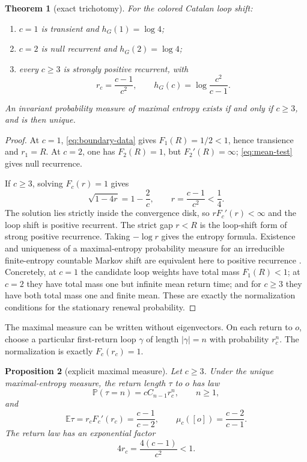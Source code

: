 \documentclass[11pt,a4paper]{amsart}
\newtheorem{theorem}{Theorem}[section]
\newtheorem{proposition}[theorem]{Proposition}
\theoremstyle{definition}
\theoremstyle{remark}
\begin{document}
\begin{theorem}[exact trichotomy]\label{thm:trichotomy}
For the colored Catalan loop shift:
\begin{enumerate}
\item $c=1$ is transient and $h_G(1)=\log4$;
\item $c=2$ is null recurrent and $h_G(2)=\log4$;
\item every $c\geq3$ is strongly positive recurrent, with
\[
 r_c=\frac{c-1}{c^2},\qquad
 h_G(c)=\log\frac{c^2}{c-1}.
\]
\end{enumerate}
An invariant probability measure of maximal entropy exists if and only if
$c\geq3$, and is then unique.
\end{theorem}

\begin{proof}
At $c=1$, \eqref{eq:boundary-data} gives $F_1(R)=1/2<1$, hence transience
and $r_1=R$.  At $c=2$, one has $F_2(R)=1$, but
$F_2'(R)=\infty$; \eqref{eq:mean-test} gives null recurrence.

If $c\geq3$, solving $F_c(r)=1$ gives
\[
 \sqrt{1-4r}=1-\frac2c,\qquad
 r=\frac{c-1}{c^2}<\frac14.
\]
The solution lies strictly inside the convergence disk, so
$rF_c'(r)<\infty$ and the loop shift is positive recurrent.  The strict
gap $r<R$ is the loop-shift form of strong positive recurrence.  Taking
$-\log r$ gives the entropy formula.  Existence and uniqueness of a
maximal-entropy probability measure for an irreducible finite-entropy
countable Markov shift are equivalent here to positive recurrence
\cite{GurevichSavchenko1998,Sarig1999}.  Concretely, at $c=1$ the candidate
loop weights have total mass $F_1(R)<1$; at $c=2$ they have total mass one
but infinite mean return time; and for $c\geq3$ they have both total mass one
and finite mean.  These are exactly the normalization conditions for the
stationary renewal probability.
\end{proof}

The maximal measure can be written without eigenvectors.  On each return to
$o$, choose a particular first-return loop $\gamma$ of length $|\gamma|=n$
with probability $r_c^n$.  The normalization is exactly $F_c(r_c)=1$.

\begin{proposition}[explicit maximal measure]\label{prop:mme}
Let $c\geq3$.  Under the unique maximal-entropy measure, the return length
$\tau$ to $o$ has law
\[
 \mathbb P(\tau=n)=cC_{n-1}r_c^n,\qquad n\geq1,
\]
and
\[
 \mathbb E\tau=r_cF_c'(r_c)=\frac{c-1}{c-2},\qquad
 \mu_c([o])=\frac{c-2}{c-1}.
\]
The return law has an exponential factor
\[
 4r_c=\frac{4(c-1)}{c^2}<1.
\]
\end{proposition}
\end{document}
